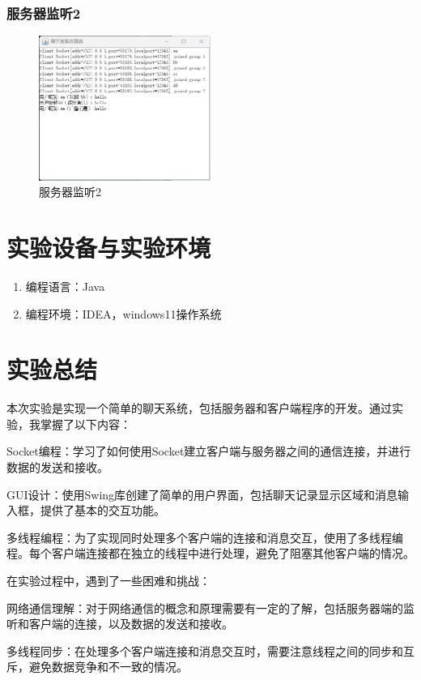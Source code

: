 \documentclass[UTF8,12pt]{article}
\begin{document}
\subsubsection{服务器监听2}
\begin{figure}[htbp]
    \centering
    \includegraphics[width=0.5\textwidth]{img/16.png}
    \caption{服务器监听2}
\end{figure}

\section{实验设备与实验环境}
\begin{enumerate}
    \item 编程语言：Java
    \item 编程环境：IDEA，windows11操作系统
\end{enumerate}

\section{实验总结}
本次实验是实现一个简单的聊天系统，包括服务器和客户端程序的开发。通过实验，我掌握了以下内容：

Socket编程：学习了如何使用Socket建立客户端与服务器之间的通信连接，并进行数据的发送和接收。

GUI设计：使用Swing库创建了简单的用户界面，包括聊天记录显示区域和消息输入框，提供了基本的交互功能。

多线程编程：为了实现同时处理多个客户端的连接和消息交互，使用了多线程编程。每个客户端连接都在独立的线程中进行处理，避免了阻塞其他客户端的情况。

在实验过程中，遇到了一些困难和挑战：

网络通信理解：对于网络通信的概念和原理需要有一定的了解，包括服务器端的监听和客户端的连接，以及数据的发送和接收。

多线程同步：在处理多个客户端连接和消息交互时，需要注意线程之间的同步和互斥，避免数据竞争和不一致的情况。
\end{document}
